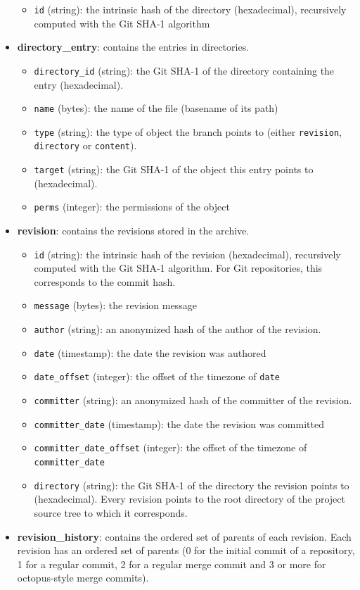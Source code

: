 \begin{itemize}
  \begin{itemize}
  \tightlist
  \item
    \texttt{id} (string): the intrinsic hash of the directory
    (hexadecimal), recursively computed with the Git SHA-1 algorithm
  \end{itemize}
\item
  \textbf{directory\_entry}: contains the entries in directories.

  \begin{itemize}
  \tightlist
  \item
    \texttt{directory\_id} (string): the Git SHA-1 of the directory
    containing the entry (hexadecimal).
  \item
    \texttt{name} (bytes): the name of the file (basename of its path)
  \item
    \texttt{type} (string): the type of object the branch points to
    (either \texttt{revision}, \texttt{directory} or \texttt{content}).
  \item
    \texttt{target} (string): the Git SHA-1 of the object this entry
    points to (hexadecimal).
  \item
    \texttt{perms} (integer): the permissions of the object
  \end{itemize}
\item
  \textbf{revision}: contains the revisions stored in the archive.

  \begin{itemize}
  \tightlist
  \item
    \texttt{id} (string): the intrinsic hash of the revision
    (hexadecimal), recursively computed with the Git SHA-1 algorithm.
    For Git repositories, this corresponds to the commit hash.
  \item
    \texttt{message} (bytes): the revision message
  \item
    \texttt{author} (string): an anonymized hash of the author of the
    revision.
  \item
    \texttt{date} (timestamp): the date the revision was authored
  \item
    \texttt{date\_offset} (integer): the offset of the timezone of
    \texttt{date}
  \item
    \texttt{committer} (string): an anonymized hash of the committer of
    the revision.
  \item
    \texttt{committer\_date} (timestamp): the date the revision was
    committed
  \item
    \texttt{committer\_date\_offset} (integer): the offset of the
    timezone of \texttt{committer\_date}
  \item
    \texttt{directory} (string): the Git SHA-1 of the directory the
    revision points to (hexadecimal). Every revision points to the root
    directory of the project source tree to which it corresponds.
  \end{itemize}
\item
  \textbf{revision\_history}: contains the ordered set of parents of
  each revision. Each revision has an ordered set of parents (0 for the
  initial commit of a repository, 1 for a regular commit, 2 for a
  regular merge commit and 3 or more for octopus-style merge commits).


\end{itemize}
